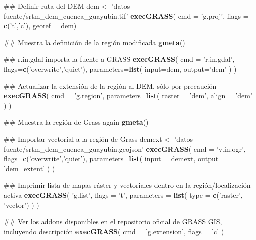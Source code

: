 \documentclass[11pt,]{article}
\newenvironment{Shaded}{\begin{snugshade}}{\end{snugshade}}
\newcommand{\KeywordTok}[1]{\textcolor[rgb]{0.13,0.29,0.53}{\textbf{#1}}}
\newcommand{\DataTypeTok}[1]{\textcolor[rgb]{0.13,0.29,0.53}{#1}}
\newcommand{\StringTok}[1]{\textcolor[rgb]{0.31,0.60,0.02}{#1}}
\newcommand{\NormalTok}[1]{#1}
\begin{document}
\begin{Shaded}
\begin{Highlighting}[]
\NormalTok{## Definir ruta del DEM}
\NormalTok{dem <-}\StringTok{ 'datos-fuente/srtm_dem_cuenca_guayubin.tif'}
\KeywordTok{execGRASS}\NormalTok{(}
  \DataTypeTok{cmd =} \StringTok{'g.proj'}\NormalTok{,}
  \DataTypeTok{flags =} \KeywordTok{c}\NormalTok{(}\StringTok{'t'}\NormalTok{,}\StringTok{'c'}\NormalTok{),}
  \DataTypeTok{georef =}\NormalTok{ dem)}

\NormalTok{## Muestra la definición de la región modificada}
\KeywordTok{gmeta}\NormalTok{()}

\NormalTok{## r.in.gdal importa la fuente a GRASS}
\KeywordTok{execGRASS}\NormalTok{(}
  \DataTypeTok{cmd =} \StringTok{'r.in.gdal'}\NormalTok{,}
  \DataTypeTok{flags=}\KeywordTok{c}\NormalTok{(}\StringTok{'overwrite'}\NormalTok{,}\StringTok{'quiet'}\NormalTok{),}
  \DataTypeTok{parameters=}\KeywordTok{list}\NormalTok{(}
    \DataTypeTok{input=}\NormalTok{dem,}
    \DataTypeTok{output=}\StringTok{'dem'}
\NormalTok{  )}
\NormalTok{)}

\NormalTok{## Actualizar la extensión de la región al DEM, sólo por precaución}
\KeywordTok{execGRASS}\NormalTok{(}
  \DataTypeTok{cmd =} \StringTok{'g.region'}\NormalTok{,}
  \DataTypeTok{parameters=}\KeywordTok{list}\NormalTok{(}
    \DataTypeTok{raster =} \StringTok{'dem'}\NormalTok{,}
    \DataTypeTok{align =} \StringTok{'dem'}
\NormalTok{  )}
\NormalTok{)}

\NormalTok{## Muestra la región de Grass again}
\KeywordTok{gmeta}\NormalTok{()}

\NormalTok{## Importar vectorial a la región de Grass}
\NormalTok{demext <-}\StringTok{ 'datos-fuente/srtm_dem_cuenca_guayubin.geojson'}
\KeywordTok{execGRASS}\NormalTok{(}
  \DataTypeTok{cmd =} \StringTok{'v.in.ogr'}\NormalTok{,}
  \DataTypeTok{flags=}\KeywordTok{c}\NormalTok{(}\StringTok{'overwrite'}\NormalTok{,}\StringTok{'quiet'}\NormalTok{),}
  \DataTypeTok{parameters=}\KeywordTok{list}\NormalTok{(}
    \DataTypeTok{input =}\NormalTok{ demext,}
    \DataTypeTok{output =} \StringTok{'dem_extent'}
\NormalTok{  )}
\NormalTok{)}

\NormalTok{## Imprimir lista de mapas ráster y vectoriales dentro en la región/localización activa}
\KeywordTok{execGRASS}\NormalTok{(}
  \StringTok{'g.list'}\NormalTok{,}
  \DataTypeTok{flags =} \StringTok{'t'}\NormalTok{,}
  \DataTypeTok{parameters =} \KeywordTok{list}\NormalTok{(}
    \DataTypeTok{type =} \KeywordTok{c}\NormalTok{(}\StringTok{'raster'}\NormalTok{, }\StringTok{'vector'}\NormalTok{)}
\NormalTok{  )}
\NormalTok{)}

\NormalTok{## Ver los addons disponibles en el repositorio oficial de GRASS GIS, incluyendo descripción}
\KeywordTok{execGRASS}\NormalTok{(}
  \DataTypeTok{cmd =} \StringTok{'g.extension'}\NormalTok{,}
  \DataTypeTok{flags =} \StringTok{'c'}
\NormalTok{)}


\end{Highlighting}
\end{Shaded}
\end{document}

